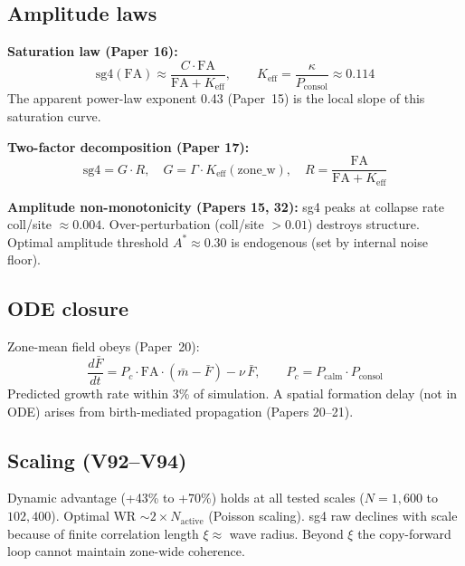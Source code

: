\documentclass[11pt]{article}
\begin{document}
\subsection{Amplitude laws}

\textbf{Saturation law (Paper 16):}
\begin{equation}
\mathrm{sg4}(\mathrm{FA}) \approx \frac{C \cdot \mathrm{FA}}{\mathrm{FA} + K_\mathrm{eff}}, \qquad
K_\mathrm{eff} = \frac{\kappa}{P_\mathrm{consol}} \approx 0.114
\end{equation}
The apparent power-law exponent 0.43 (Paper~15) is the local slope of this saturation curve.

\textbf{Two-factor decomposition (Paper 17):}
\begin{equation}
\mathrm{sg4} = G \cdot R, \quad
G = \Gamma \cdot K_\mathrm{eff}(\text{zone\_w}), \quad
R = \frac{\mathrm{FA}}{\mathrm{FA} + K_\mathrm{eff}}
\end{equation}

\textbf{Amplitude non-monotonicity (Papers 15, 32):}
sg4 peaks at collapse rate coll/site $\approx 0.004$.
Over-perturbation (coll/site $> 0.01$) destroys structure.
Optimal amplitude threshold $A^* \approx 0.30$ is endogenous (set by internal noise floor).

\subsection{ODE closure}

Zone-mean field obeys (Paper~20):
\begin{equation}
\frac{d\bar{F}}{dt} = P_c \cdot \mathrm{FA} \cdot (\bar{m} - \bar{F}) - \nu\,\bar{F},
\qquad P_c = P_\mathrm{calm} \cdot P_\mathrm{consol}
\end{equation}
Predicted growth rate within 3\% of simulation. A spatial formation delay
(not in ODE) arises from birth-mediated propagation (Papers 20--21).

\subsection{Scaling (V92--V94)}

Dynamic advantage (+43\% to +70\%) holds at all tested scales ($N = 1{,}600$ to $102{,}400$).
Optimal WR $\sim 2 \times N_\mathrm{active}$ (Poisson scaling).
sg4 raw declines with scale because of finite correlation length $\xi \approx$ wave radius.
Beyond $\xi$ the copy-forward loop cannot maintain zone-wide coherence.
\end{document}
